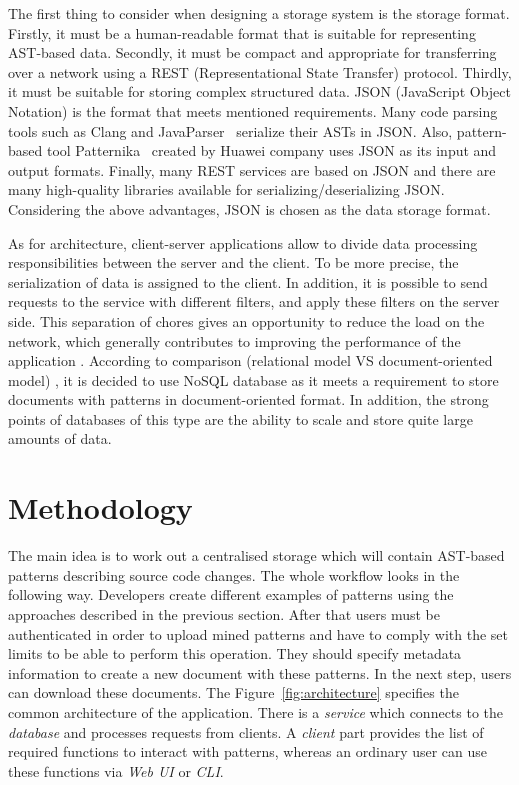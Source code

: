 \documentclass[letterpaper, 10 pt, conference]{ieeeconf}  %
\begin{document}
The first thing to consider when designing a storage system is the storage
format. 
Firstly, it must be a human-readable format that is suitable for
representing AST-based data. 
Secondly, it must be compact and appropriate for transferring over a network 
using a REST (Representational State Transfer) \cite{c12} protocol. 
Thirdly, it must be suitable for storing complex structured data.
JSON (JavaScript Object Notation) \cite{c7} is the format that meets mentioned
requirements.
Many code parsing tools such as Clang and JavaParser~\cite{c8} serialize 
their ASTs in JSON. 
Also, pattern-based tool Patternika~\cite{c1} created by Huawei company uses
JSON as its input and output formats.
Finally, many REST services are based on JSON and there are many high-quality
libraries available for serializing/deserializing JSON. 
Considering the above advantages, JSON is chosen as the data storage format.

As for architecture, client-server applications allow to divide data
processing responsibilities between the server and the client. 
To be more precise, the serialization of data is assigned to the client. 
In addition, it is possible to send requests to the service with different
filters, and apply these filters on the server side. 
This separation of chores gives an opportunity to reduce the load on the
network, which generally contributes to improving the performance of the
application \cite{c10}. 
According to comparison (relational model VS document-oriented model)
\cite{c11}, it is decided to use NoSQL database as it meets a requirement 
to store documents with patterns in document-oriented format. 
In addition, the strong points of databases of this type are the ability to
scale and store quite large amounts of data.

\section{Methodology}
\label{section:method}

The main idea is to work out a centralised storage which will contain AST-based
patterns describing source code changes.
The whole workflow looks in the following way.
Developers create different examples of patterns using the approaches described
in the previous section.
After that users must be authenticated in order to upload mined patterns and
have to comply with the set limits to be able to perform this operation.
They should specify metadata information to create a new document with these
patterns.
In the next step, users can download these documents.
The Figure~\ref{fig:architecture} specifies the common architecture of the
application.
There is a \emph{service} which connects to the \emph{database} and processes
requests from clients. 
A \emph{client} part provides the list of required functions to interact 
with patterns, whereas an ordinary user can use these functions via 
\emph{Web UI} or \emph{CLI}.
\end{document}
